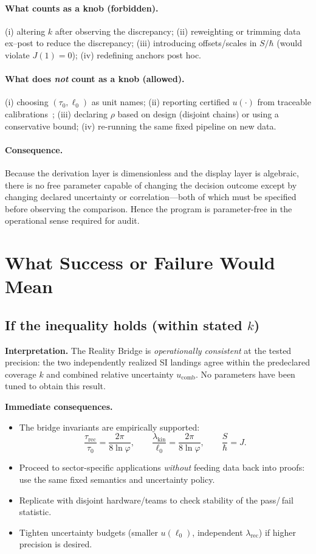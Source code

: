 \documentclass[11pt]{article}
\theoremstyle{plain}
\theoremstyle{definition}
\theoremstyle{remark}
\begin{document}
\paragraph{What counts as a knob (forbidden).}
(i) altering \(k\) after observing the discrepancy; (ii) reweighting or trimming data ex–post to reduce the discrepancy; (iii) introducing offsets/scales in \(S/\hbar\) (would violate \(J(1)=0\)); (iv) redefining anchors post hoc.

\paragraph{What does \emph{not} count as a knob (allowed).}
(i) choosing \((\tau_{0},\ell_{0})\) as unit names; (ii) reporting certified \(u(\cdot)\) from traceable calibrations~\cite{ISO17025,CIPM_MRA}; (iii) declaring \(\rho\) based on design (disjoint chains) or using a conservative bound; (iv) re-running the same fixed pipeline on new data.

\paragraph{Consequence.}
Because the derivation layer is dimensionless and the display layer is algebraic, there is no free parameter capable of changing the decision outcome except by changing declared uncertainty or correlation—both of which must be specified before observing the comparison. Hence the program is parameter-free in the operational sense required for audit.

\section{What Success or Failure Would Mean}

\subsection*{If the inequality holds (within stated \(k\))}
\textbf{Interpretation.} The Reality Bridge is \emph{operationally consistent} at the tested precision: the two independently realized SI landings agree within the pre\-declared coverage \(k\) and combined relative uncertainty \(u_{\mathrm{comb}}\). No parameters have been tuned to obtain this result.

\textbf{Immediate consequences.}
\begin{itemize}
  \item The bridge invariants are empirically supported:
  \[
  \frac{\tau_{\mathrm{rec}}}{\tau_{0}}=\frac{2\pi}{8\ln\varphi},\qquad
  \frac{\lambda_{\mathrm{kin}}}{\ell_{0}}=\frac{2\pi}{8\ln\varphi},\qquad
  \frac{S}{\hbar}=J.
  \]
  \item Proceed to sector-specific applications \emph{without} feeding data back into proofs: use the same fixed semantics and uncertainty policy.
  \item Replicate with disjoint hardware/teams to check stability of the pass/\,fail statistic.
  \item Tighten uncertainty budgets (smaller \(u(\ell_{0})\), independent \(\lambda_{\mathrm{rec}}\)) if higher precision is desired.
\end{itemize}
\end{document}
